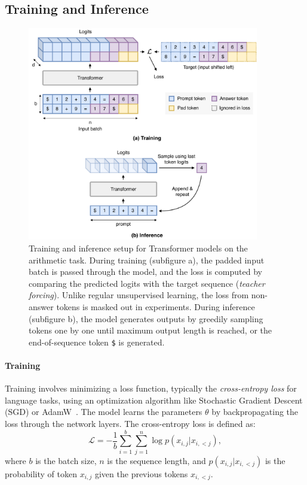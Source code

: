 \subsection{Training and Inference}\label{subsec:training_inference}

\begin{figure}[h!]
    \centering
    \includegraphics[width=0.9\textwidth]{fig/training_and_inference.pdf}
    \caption{Training and inference setup for Transformer models on the arithmetic task. During training (subfigure a), the padded input batch is passed through the model, and the loss is computed by comparing the predicted logits with the target sequence (\emph{teacher forcing}). Unlike regular unsupervised learning, the loss from non-answer tokens is masked out in experiments. During inference (subfigure b), the model generates outputs by greedily sampling tokens one by one until maximum output length is reached, or the end-of-sequence token \texttt{\$} is generated.}
    \label{fig:transformer_training_inference}
\end{figure}

\paragraph{Training}
Training involves minimizing a loss function, typically the \emph{cross-entropy loss} for language tasks, using an optimization algorithm like Stochastic Gradient Descent (SGD) or AdamW~\parencite{loshchilov_decoupled_2018}. The model learns the parameters $\theta$ by backpropagating the loss through the network layers. The cross-entropy loss is defined as:
\begin{equation*}
    \mathcal{L} = -\frac{1}{b} \sum_{i=1}^{b} \sum_{j=1}^{n} \log p(x_{i,j} | x_{i,<j}),
\end{equation*}
where $b$ is the batch size, $n$ is the sequence length, and $p(x_{i,j} | x_{i,<j})$ is the probability of token $x_{i,j}$ given the previous tokens $x_{i,<j}$.

